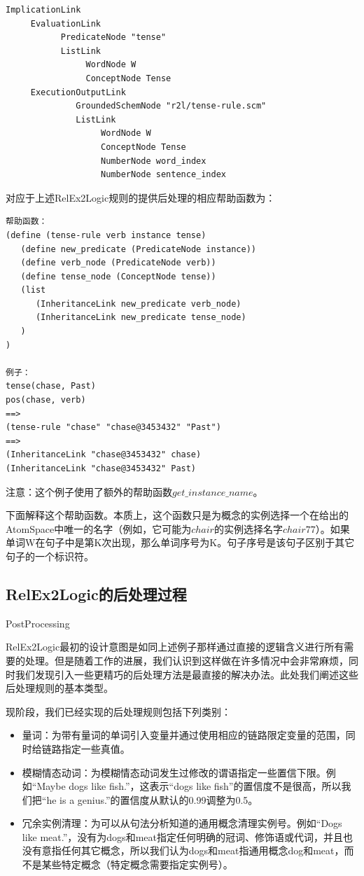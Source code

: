 \begin{verbatim}
ImplicationLink
     EvaluationLink
           PredicateNode "tense"
           ListLink
                WordNode W
                ConceptNode Tense
     ExecutionOutputLink
              GroundedSchemNode "r2l/tense-rule.scm"
              ListLink
                   WordNode W
                   ConceptNode Tense
                   NumberNode word_index
                   NumberNode sentence_index

\end{verbatim}

对应于上述RelEx2Logic规则的提供后处理的相应帮助函数为：

\begin{verbatim}
帮助函数：
(define (tense-rule verb instance tense)
   (define new_predicate (PredicateNode instance))
   (define verb_node (PredicateNode verb)) 
   (define tense_node (ConceptNode tense))
   (list
      (InheritanceLink new_predicate verb_node)
      (InheritanceLink new_predicate tense_node)
   )
)

例子：
tense(chase, Past)
pos(chase, verb)
==>
(tense-rule "chase" "chase@3453432" "Past")
==>
(InheritanceLink "chase@3453432" chase)
(InheritanceLink "chase@3453432" Past)

\end{verbatim}

注意：这个例子使用了额外的帮助函数$get\_instance\_name$。

下面解释这个帮助函数。本质上，这个函数只是为概念的实例选择一个在给出的AtomSpace中唯一的名字（例如，它可能为$chair$的实例选择名字$chair77$）。如果单词W在句子中是第K次出现，那么单词序号为K。句子序号是该句子区别于其它句子的一个标识符。

\subsection{RelEx2Logic的后处理过程}{PostProcessing}

RelEx2Logic最初的设计意图是如同上述例子那样通过直接的逻辑含义进行所有需要的处理。但是随着工作的进展，我们认识到这样做在许多情况中会非常麻烦，同时我们发现引入一些更精巧的后处理方法是最直接的解决办法。此处我们阐述这些后处理规则的基本类型。

现阶段，我们已经实现的后处理规则包括下列类别：

\begin{itemize}
\item 量词：为带有量词的单词引入变量并通过使用相应的链路限定变量的范围，同时给链路指定一些真值。
\item 模糊情态动词：为模糊情态动词发生过修改的谓语指定一些置信下限。例如“Maybe dogs like fish.”，这表示“dogs like fish”的置信度不是很高，所以我们把“he is a genius.”的置信度从默认的0.99调整为0.5。
\item 冗余实例清理：为可以从句法分析知道的通用概念清理实例号。例如“Dogs like meat.”，没有为dogs和meat指定任何明确的冠词、修饰语或代词，并且也没有意指任何其它概念，所以我们认为dogs和meat指通用概念dog和meat，而不是某些特定概念（特定概念需要指定实例号）。
\end{itemize}

